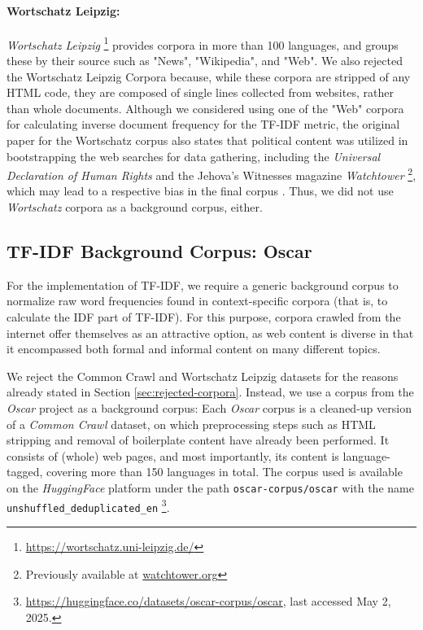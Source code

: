 \paragraph{Wortschatz Leipzig:}
\textit{Wortschatz Leipzig} \footnote{\url{https://wortschatz.uni-leipzig.de/}} provides corpora in more than 100 languages, and groups these by their source such as "News", "Wikipedia", and "Web".
We also rejected the Wortschatz Leipzig Corpora because, while these corpora are stripped of any HTML code, they are composed of single lines collected from websites, rather than whole documents.
Although we considered using one of the "Web" corpora for calculating inverse document frequency for the TF-IDF metric, the original paper for the Wortschatz corpus also states that political content was utilized in bootstrapping the web searches for data gathering, including the \textit{Universal Declaration of Human Rights} and the Jehova's Witnesses magazine \textit{Watchtower} \footnote{Previously available at \url{watchtower.org}}, which may lead to a respective bias in the final corpus \cite{goldhahnBuildingLargeMonolingual2012}.
Thus, we did not use \textit{Wortschatz} corpora as a background corpus, either.

\subsection{TF-IDF Background Corpus: Oscar} \label{sec:oscar}
For the implementation of TF-IDF, we require a generic background corpus to normalize raw word frequencies found in context-specific corpora (that is, to calculate the IDF part of TF-IDF).
For this purpose, corpora crawled from the internet offer themselves as an attractive option, as web content is diverse in that it encompassed both formal and informal content on many different topics.

We reject the Common Crawl and Wortschatz Leipzig datasets for the reasons already stated in Section \ref{sec:rejected-corpora}.
Instead, we use a corpus from the \textit{Oscar} project \cite{suarezAsynchronousPipelineProcessing2019} as a background corpus:
Each \textit{Oscar} corpus is a cleaned-up version of a \textit{Common Crawl} dataset, on which preprocessing steps such as HTML stripping and removal of boilerplate content have already been performed.
It consists of (whole) web pages, and most importantly, its content is language-tagged, covering more than 150 languages in total.
The corpus used is available on the \textit{HuggingFace} platform under the path \texttt{oscar-corpus/oscar} with the name \texttt{unshuffled\_deduplicated\_en} \footnote{\url{https://huggingface.co/datasets/oscar-corpus/oscar}, last accessed May 2, 2025.}.


